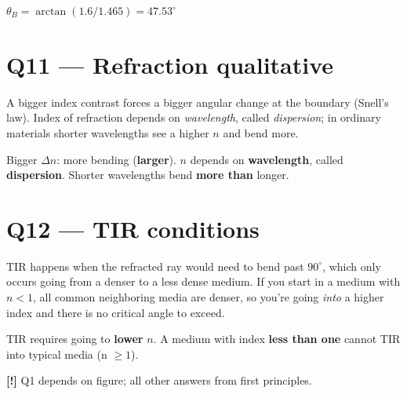 \documentclass[11pt]{article}
\newcommand{\warn}{\textbf{[!]}}
\begin{document}
$\theta_B = \arctan(1.6/1.465) = \boxed{47.53^\circ}$

\section*{Q11 --- Refraction qualitative}
A bigger index contrast forces a bigger angular change at the boundary (Snell's law). Index of refraction depends on \emph{wavelength}, called \emph{dispersion}; in ordinary materials shorter wavelengths see a higher $n$ and bend more.

Bigger $\Delta n$: more bending (\textbf{larger}). $n$ depends on \textbf{wavelength}, called \textbf{dispersion}. Shorter wavelengths bend \textbf{more than} longer.

\section*{Q12 --- TIR conditions}
TIR happens when the refracted ray would need to bend past $90^\circ$, which only occurs going from a denser to a less dense medium. If you start in a medium with $n<1$, all common neighboring media are denser, so you're going \emph{into} a higher index and there is no critical angle to exceed.

TIR requires going to \textbf{lower} $n$. A medium with index \textbf{less than one} cannot TIR into typical media (n $\ge 1$).

\bigskip\warn{} Q1 depends on figure; all other answers from first principles.
\end{document}

